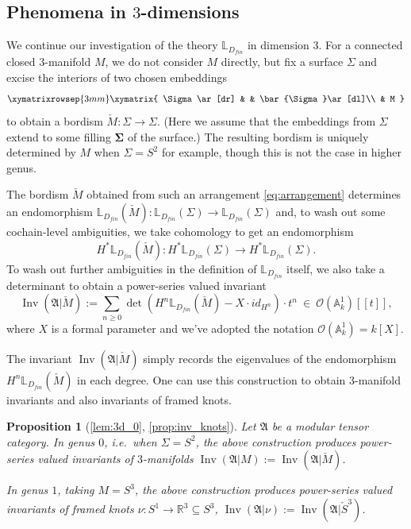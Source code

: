 \documentclass[reqno]{amsart}
\newtheorem*{propositionA}{Proposition}
\theoremstyle{definition}
\newcommand{\mfk}[1]{\mathfrak{#1}}
\newcommand{\mbb}[1]{\mathbb{#1}}
\newcommand{\mcl}[1]{\mathcal{#1}}
\newcommand{\mbf}[1]{\mathbf{#1}}
\newcommand{\opn}[1]{\operatorname{#1}}
\renewcommand{\1}{\mathbf{1}}
\begin{document}
\subsection{Phenomena in $3$-dimensions}

We continue our investigation of the theory $\mbb{L}_{D_{fin}}$ in dimension $3$.  For a connected closed $3$-manifold $M$, we do not consider $M$ directly, but fix a surface $\Sigma$ and excise the interiors of two chosen embeddings
\begin{equation}\label{eq:arrangement}
\xymatrixrowsep{3mm}
\xymatrix{
\Sigma\ar[dr] & & \bar{\Sigma}\ar[dl]\\
	& M
}
\end{equation}
to obtain a bordism $\check{M}:\Sigma\to \Sigma$.  (Here we assume that the embeddings from $\Sigma$ extend to some filling $\mbf{\Sigma}$ of the surface.)  The resulting bordism is uniquely determined by $M$ when $\Sigma=S^2$ for example, though this is not the case in higher genus.
\par

The bordism $\check{M}$ obtained from such an arrangement \eqref{eq:arrangement} determines an endomorphism $\mbb{L}_{D_{fin}}(\check{M}):\mbb{L}_{D_{fin}}(\Sigma)\to \mbb{L}_{D_{fin}}(\Sigma)$ and, to wash out some cochain-level ambiguities, we take cohomology to get an endomorphism
\[
H^{\ast}\mbb{L}_{D_{fin}}(\check{M}):H^{\ast}\mbb{L}_{D_{fin}}(\Sigma)\to H^{\ast}\mbb{L}_{D_{fin}}(\Sigma).
\]
To wash out further ambiguities in the definition of $\mbb{L}_{D_{fin}}$ itself, we also take a determinant to obtain a power-series valued invariant
\begin{equation}\label{ex:342}
\opn{Inv}(\mfk{A}|\check{M}):=\sum_{n\geq 0}\det(H^n\mbb{L}_{D_{fin}}(\check{M})-X\cdot id_{H^n})\cdot t^n\ \in\ \mcl{O}(\mbb{A}^1_k)[\![t]\!],
\end{equation}
where $X$ is a formal parameter and we've adopted the notation $\mcl{O}(\mbb{A}^1_k)=k[X]$.
\par

The invariant $\opn{Inv}(\mfk{A}|\check{M})$ simply records the eigenvalues of the endomorphism $H^n\mbb{L}_{D_{fin}}(\check{M})$ in each degree.  One can use this construction to obtain $3$-manifold invariants and also invariants of framed knots.

\begin{propositionA}[{\ref{lem:3d_0}, \ref{prop:inv_knots}}]
Let $\mfk{A}$ be a modular tensor category.  In genus $0$, i.e.\ when $\Sigma=S^2$, the above construction produces power-series valued invariants of $3$-manifolds $\opn{Inv}(\mfk{A}|M):=\opn{Inv}(\mfk{A}|\check{M})$.
\par

In genus $1$, taking $M=S^3$, the above construction produces power-series valued invariants of framed knots $\nu:S^1\to \mbb{R}^3\subseteq S^3$, $\opn{Inv}(\mfk{A}|\nu):=\opn{Inv}(\mfk{A}|\check{S}^3)$.
\end{propositionA}
\end{document}
